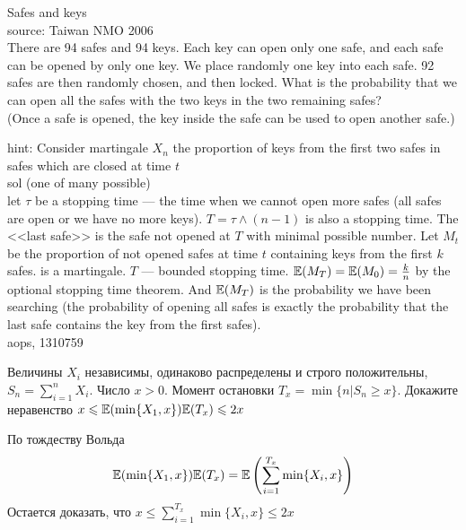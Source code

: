 \begin{problem}
Safes and keys \\
source: Taiwan NMO 2006\\
There are 94 safes and 94 keys. Each key can open only one safe, and each safe can be opened by only one key. We place randomly one key into each safe. 92 safes are then randomly chosen, and then locked. What is the probability that we can open all the safes with the two keys in the two remaining safes?\\
(Once a safe is opened, the key inside the safe can be used to open another safe.)

\begin{sol}

hint: Consider martingale $X_{n}$ the proportion of keys from the first two safes in safes which are closed at time $t$ \\
sol (one of many possible) \\
let $\tau$ be a stopping time — the time when we cannot open more safes (all safes are open or we have no more keys). $T=\tau \wedge (n-1)$ is also a stopping time. The <<last safe>> is the safe not opened at $T$ with minimal possible number. Let $M_{t}$  be the proportion of not opened safes at time $t$  containing keys from the first $k$ safes.  is a martingale. $T$ — bounded stopping time. $\mathbb{E}(M_{T}) = \mathbb{E}(M_{0}) = \frac {k}{n}$ by the optional stopping time theorem. And $\mathbb{E}(M_{T})$ is the probability we have been searching (the probability of opening all safes is exactly the probability that the last safe contains the key from the first  safes). \\
aops, 1310759
\end{sol}
\end{problem}

\begin{problem}
Величины $X_i$ независимы, одинаково распределены и строго положительны, $S_n=\sum_{i=1}^n X_i$. Число $x>0$. Момент остановки $T_x=\min\{n|S_n\geq x\}$. Докажите неравенство $x\leqslant \mathbb{E}(\min\{X_1,x\})\mathbb{E}(T_x)\leqslant 2x$

\begin{sol}
По тождеству Вольда
\begin{equation}
 \mathbb{E}(\min\{X_1,x\})\mathbb{E}(T_x)=\mathbb{E}\left(\sum_{i=1}^{T_x}\min\{X_i,x\} \right)
\end{equation}
Остается доказать, что $x\leq \sum_{i=1}^{T_x}\min\{X_i,x\}\leq 2x $
\end{sol}
\end{problem}


